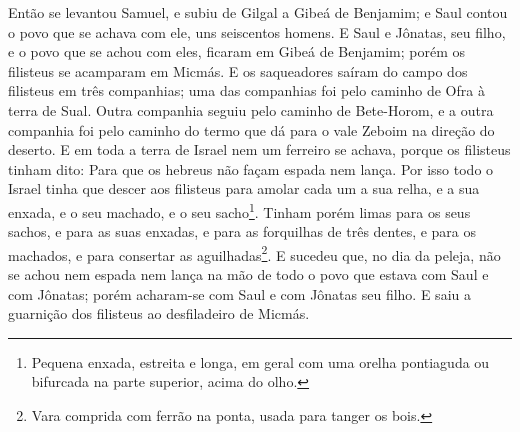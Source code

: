 Então se levantou Samuel, e subiu de Gilgal a Gibeá de Benjamim;
e Saul contou o povo que se achava com ele, uns seiscentos homens.
E Saul e Jônatas, seu filho, e o povo que se achou com eles,
ficaram em Gibeá de Benjamim; porém os filisteus se acamparam em
Micmás. E os saqueadores saíram do campo dos filisteus em
três companhias; uma das companhias foi pelo caminho de Ofra à terra
de Sual. Outra companhia seguiu pelo caminho de Bete-Horom, e
a outra companhia foi pelo caminho do termo que dá para o vale
Zeboim na direção do deserto. E em toda a terra de Israel nem
um ferreiro se achava, porque os filisteus tinham dito: Para que os
hebreus não façam espada nem lança. Por isso todo o Israel
tinha que descer aos filisteus para amolar cada um a sua relha, e a
sua enxada, e o seu machado, e o seu sacho\footnote{Pequena enxada,
estreita e longa, em geral com uma orelha pontiaguda ou bifurcada na
parte superior, acima do olho.}. Tinham porém limas para os
seus sachos, e para as suas enxadas, e para as forquilhas de três
dentes, e para os machados, e para consertar as
aguilhadas\footnote{Vara comprida com ferrão na ponta, usada para
tanger os bois.}. E sucedeu que, no dia da peleja, não se
achou nem espada nem lança na mão de todo o povo que estava com Saul
e com Jônatas; porém acharam-se com Saul e com Jônatas seu filho.
E saiu a guarnição dos filisteus ao desfiladeiro de Micmás.

\medskip

